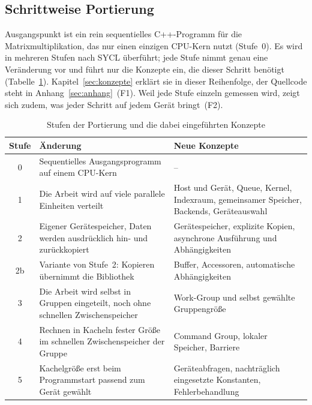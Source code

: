 \documentclass[12pt,a4paper]{article}
\begin{document}
\subsection{Schrittweise Portierung}\label{sec:m-portierung}

Ausgangspunkt ist ein rein sequentielles C++-Programm für die
Matrixmultiplikation, das nur einen einzigen CPU-Kern nutzt (Stufe~0). Es wird in
mehreren Stufen nach SYCL überführt; jede Stufe nimmt genau eine Veränderung vor
und führt nur die Konzepte ein, die dieser Schritt benötigt
(Tabelle~\ref{tab:stufen}). Kapitel~\ref{sec:konzepte} erklärt sie in dieser
Reihenfolge, der Quellcode steht in Anhang~\ref{sec:anhang}~(F1). Weil jede Stufe
einzeln gemessen wird, zeigt sich zudem, was jeder Schritt auf jedem Gerät
bringt~(F2).

\begin{table}[htbp]
\centering
\footnotesize
\caption[Stufen der Portierung und eingeführte Konzepte]{Stufen der Portierung und die dabei eingeführten Konzepte}
\label{tab:stufen}
\begin{tabularx}{\textwidth}{@{}c>{\raggedright\arraybackslash}X>{\raggedright\arraybackslash}X@{}}
\toprule
Stufe & Änderung & Neue Konzepte \\
\midrule
0 & Sequentielles Ausgangsprogramm auf einem CPU-Kern & -- \\
1 & Die Arbeit wird auf viele parallele Einheiten verteilt & Host und Gerät, Queue, Kernel, Indexraum, gemeinsamer Speicher, Backends, Geräteauswahl \\
2 & Eigener Gerätespeicher, Daten werden ausdrücklich hin- und zurückkopiert & Gerätespeicher, explizite Kopien, asynchrone Ausführung und Abhängigkeiten \\
2b & Variante von Stufe~2: Kopieren übernimmt die Bibliothek & Buffer, Accessoren, automatische Abhängigkeiten \\
3 & Die Arbeit wird selbst in Gruppen eingeteilt, noch ohne schnellen Zwischenspeicher & Work-Group und selbst gewählte Gruppengröße \\
4 & Rechnen in Kacheln fester Größe im schnellen Zwischenspeicher der Gruppe & Command Group, lokaler Speicher, Barriere \\
5 & Kachelgröße erst beim Programmstart passend zum Gerät gewählt & Geräteabfragen, nachträglich eingesetzte Konstanten, Fehlerbehandlung \\
\bottomrule
\end{tabularx}
\end{table}
\end{document}
